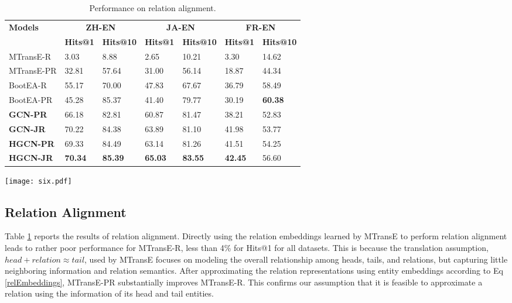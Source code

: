 \documentclass[11pt,a4paper]{article}
\begin{document}
\begin{table}
	\centering
\scriptsize
	\begin{tabular}{p{38pt}|p{14pt}<{\centering}p{18pt}<{\centering}|p{14pt}<{\centering}p{18pt}<{\centering}|p{14pt}<{\centering}p{18pt}<{\centering}}
		\toprule
		\multirow{2}{*}{\bf Models} & \multicolumn{2}{c|}{\bf ZH-EN} & \multicolumn{2}{c|}{\bf JA-EN} & \multicolumn{2}{c}{ \bf FR-EN}  \\
		& \tiny \bf Hits@1 & \tiny \bf Hits@10 & \tiny \bf Hits@1 &\tiny \bf Hits@10 & \tiny \bf Hits@1 &\tiny \bf Hits@10\\
		\midrule
		MTransE-R& 3.03 & 8.88 & 2.65 & 10.21 & 3.30 & 14.62 \\
		MTransE-PR& 32.81 & 57.64 & 31.00 & 56.14 & 18.87 & 44.34 \\
		BootEA-R& 55.17 & 70.00 & 47.83 & 67.67 & 36.79 & 58.49 \\
		BootEA-PR & 45.28 & 85.37 & 41.40 & 79.77 & 30.19 & \bf 60.38 \\
		\midrule
		\bf GCN-PR & 66.18 & 82.81 & 60.87 & 81.47 & 38.21 & 52.83 \\
		\bf GCN-JR & 70.22 & 84.38 & 63.89 & 81.10 & 41.98 & 53.77 \\
		\bf HGCN-PR & 69.33 & 84.49 & 63.14 & 81.26 & 41.51 & 54.25 \\
		\bf HGCN-JR & \bf 70.34 & \bf 85.39 & \bf 65.03 & \bf 83.55 & \bf 42.45 & 56.60 \\
		\bottomrule
	\end{tabular}
	\caption{Performance on relation alignment.}
	\label{Relresults}
\end{table}

\begin{figure*}[t!]
	\centering
	\texttt{[image: six.pdf]}
	\caption{(a)-(c) report the performance for entity alignment of HGCN-JE and BootEA when they are trained with different proportions of seed entity alignments on the three DBP15K datasets. (d)-(f) show the relation alignment performance of HGCN-JR and BootEA-R under corresponding conditions. The x-axes are the proportions of seed alignments, and the y-axes are Hits@1 scores.}
	\label{six}
\end{figure*}

\subsection{Relation Alignment\label{sec:result:ra}}
Table \ref{Relresults} reports the results of relation alignment. Directly using the relation embeddings learned by MTransE to perform
relation alignment leads to rather poor performance for MTransE-R, less than 4\% for Hits@1 for all datasets. This is because the
translation assumption, $head+relation \approx tail$, used by MTransE focuses on modeling the overall relationship among heads, tails, and
relations, but capturing little neighboring information and relation semantics. After approximating the relation representations using
entity embeddings according to Eq \ref{relEmbeddings}, MTransE-PR substantially improves MTransE-R. This confirms our assumption that it is
feasible to approximate a relation using the information of its head and tail entities.
\end{document}

